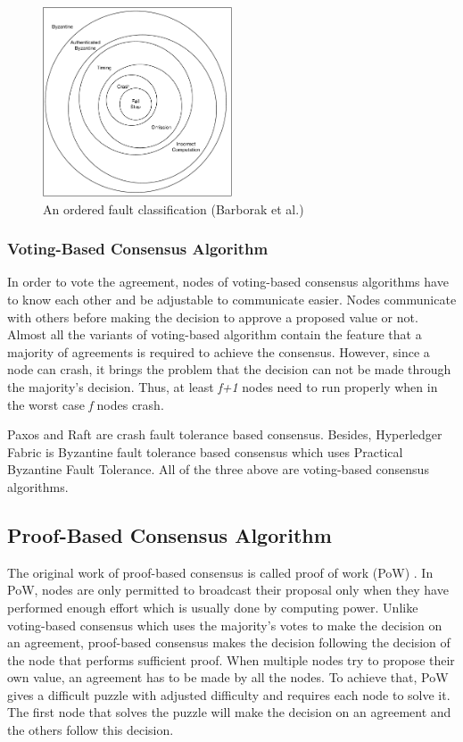 \documentclass[12pt, a4paper]{article}
\begin{document}
\begin{figure}[htp]
  \centering
  \includegraphics[width=0.5\textwidth]{img/AOFC.pdf}
  \caption{An ordered fault classification (Barborak et al.)}
  \label{fig:aofc}
\end{figure}

\subsubsection{Voting-Based Consensus Algorithm}
In order to vote the agreement, nodes of voting-based consensus algorithms have to
know each other and be adjustable to communicate easier\cite{nguyen2018survey}.
Nodes communicate with others before making the decision
to approve a proposed value or not.
Almost all the variants of voting-based algorithm contain the feature
that a majority of agreements is required to achieve the consensus.
However, since a node can crash, it brings the problem that the decision can not
be made through the majority's decision. Thus, at least \textit{f+1} nodes need
to run properly when in the worst case \textit{f} nodes crash.

Paxos\cite{lamport2001paxos} and Raft\cite{conf/usenix/OngaroO14} are
crash fault tolerance based consensus.
Besides, Hyperledger Fabric\cite{cachin2016architecture} is
Byzantine fault tolerance based consensus which
uses Practical Byzantine Fault Tolerance\cite{castro1999practical}.
All of the three above are voting-based consensus algorithms.

\subsection{Proof-Based Consensus Algorithm}
The original work of proof-based consensus is called proof of work (PoW)
\cite{nakamoto2019bitcoin}. In PoW, nodes are only permitted to
broadcast their proposal only when they have performed enough effort which
is usually done by computing power.
Unlike voting-based consensus which uses the majority's votes to
make the decision on an agreement, proof-based consensus makes the decision
following the decision of the node that performs sufficient proof.
When multiple nodes try to propose their own value, an agreement has to be made
by all the nodes. To achieve that, PoW gives a difficult puzzle with adjusted difficulty
and requires each node to solve it. The first node that solves the puzzle will make the
decision on an agreement and the others follow this decision.
\end{document}
